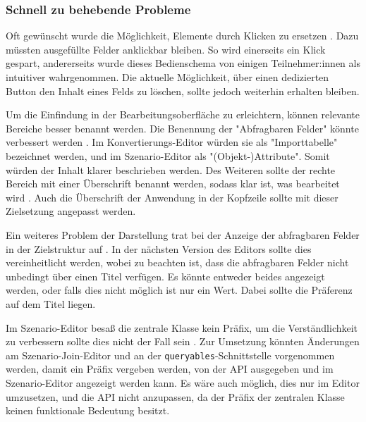 
\subsubsection{Schnell zu behebende Probleme}

Oft gewünscht wurde die Möglichkeit, Elemente durch Klicken zu ersetzen . Dazu müssten ausgefüllte Felder anklickbar bleiben. So wird einerseits ein Klick gespart, andererseits wurde dieses Bedienschema von einigen Teilnehmer:innen als intuitiver wahrgenommen. Die aktuelle Möglichkeit, über einen dedizierten Button den Inhalt eines Felds zu löschen, sollte jedoch weiterhin erhalten bleiben.

Um die Einfindung in der Bearbeitungsoberfläche zu erleichtern, können relevante Bereiche besser benannt werden. Die Benennung der "Abfragbaren Felder" könnte verbessert werden . Im Konvertierungs-Editor würden sie als "Importtabelle" bezeichnet werden, und im Szenario-Editor als "(Objekt-)Attribute". Somit würden der Inhalt klarer beschrieben werden. Des Weiteren sollte der rechte Bereich mit einer Überschrift benannt werden, sodass klar ist, was bearbeitet wird . Auch die Überschrift der Anwendung in der Kopfzeile sollte mit dieser Zielsetzung angepasst werden.

Ein weiteres Problem der Darstellung trat bei der Anzeige der abfragbaren Felder in der Zielstruktur auf . In der nächsten Version des Editors sollte dies vereinheitlicht werden, wobei zu beachten ist, dass die abfragbaren Felder nicht unbedingt über einen Titel verfügen. Es könnte entweder beides angezeigt werden, oder falls dies nicht möglich ist nur ein Wert. Dabei sollte die Präferenz auf dem Titel liegen.

Im Szenario-Editor besaß die zentrale Klasse kein Präfix, um die Verständlichkeit zu verbessern sollte dies nicht der Fall sein . Zur Umsetzung könnten Änderungen am Szenario-Join-Editor und an der \texttt{queryables}-Schnittstelle vorgenommen werden, damit ein Präfix vergeben werden, von der \ac{API} ausgegeben und im Szenario-Editor angezeigt werden kann. Es wäre auch möglich, dies nur im Editor umzusetzen, und die \ac{API} nicht anzupassen, da der Präfix der zentralen Klasse keinen funktionale Bedeutung besitzt.

